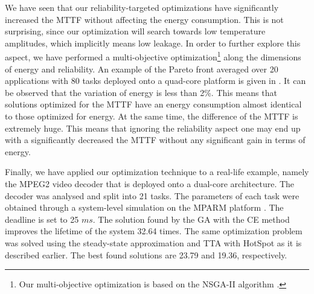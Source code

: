 We have seen that our reliability-targeted optimizations have significantly increased the MTTF without affecting the energy consumption. This is not surprising, since our optimization will search towards low temperature amplitudes, which implicitly means low leakage. In order to further explore this aspect, we have performed a multi-objective optimization\footnote{Our multi-objective optimization is based on the NSGA-II algorithm \cite{deb2002}.} along the dimensions of energy and reliability. An example of the Pareto front averaged over 20 applications with 80 tasks deployed onto a quad-core platform is given in . It can be observed that the variation of energy is less than 2\%. This means that solutions optimized for the MTTF have an energy consumption almost identical to those optimized for energy. At the same time, the difference of the MTTF is extremely huge. This means that ignoring the reliability aspect one may end up with a significantly decreased the MTTF without any significant gain in terms of energy.

Finally, we have applied our optimization technique to a real-life example, namely the MPEG2 video decoder \cite{ffmpeg2011} that is deployed onto a dual-core architecture. The decoder was analysed and split into 21 tasks. The parameters of each task were obtained through a system-level simulation on the MPARM platform \cite{benini2005}. The deadline is set to 25 $ms$. The solution found by the GA with the CE method improves the lifetime of the system 32.64 times. The same optimization problem was solved using the steady-state approximation and TTA with HotSpot as it is described earlier. The best found solutions are 23.79 and 19.36, respectively.

